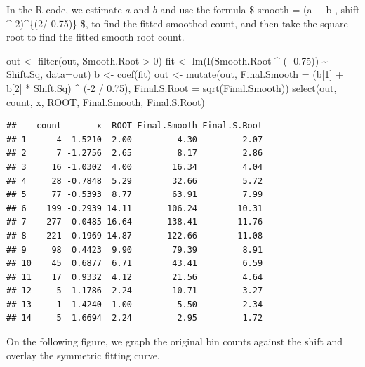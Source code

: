 \documentclass[
]{book}
\newenvironment{Shaded}{\begin{snugshade}}{\end{snugshade}}
\newcommand{\AttributeTok}[1]{\textcolor[rgb]{0.77,0.63,0.00}{#1}}
\newcommand{\DecValTok}[1]{\textcolor[rgb]{0.00,0.00,0.81}{#1}}
\newcommand{\FloatTok}[1]{\textcolor[rgb]{0.00,0.00,0.81}{#1}}
\newcommand{\FunctionTok}[1]{\textcolor[rgb]{0.00,0.00,0.00}{#1}}
\newcommand{\NormalTok}[1]{#1}
\newcommand{\OtherTok}[1]{\textcolor[rgb]{0.56,0.35,0.01}{#1}}
\newcommand{\SpecialCharTok}[1]{\textcolor[rgb]{0.00,0.00,0.00}{#1}}
\begin{document}
In the R code, we estimate \(a\) and \(b\) and use the formula \$
smooth = (a + b , shift \^{} 2)\^{}\{(2/-0.75)\}
\$, to find the fitted smoothed count, and then take the square root to find the fitted smooth root count.

\begin{Shaded}
\begin{Highlighting}[]
\NormalTok{out }\OtherTok{\textless{}{-}} \FunctionTok{filter}\NormalTok{(out, Smooth.Root }\SpecialCharTok{\textgreater{}} \DecValTok{0}\NormalTok{)}
\NormalTok{fit }\OtherTok{\textless{}{-}} \FunctionTok{lm}\NormalTok{(}\FunctionTok{I}\NormalTok{(Smooth.Root }\SpecialCharTok{\^{}}\NormalTok{ (}\SpecialCharTok{{-}} \FloatTok{0.75}\NormalTok{)) }\SpecialCharTok{\textasciitilde{}}\NormalTok{ Shift.Sq, }
          \AttributeTok{data=}\NormalTok{out)}
\NormalTok{b }\OtherTok{\textless{}{-}} \FunctionTok{coef}\NormalTok{(fit)}
\NormalTok{out }\OtherTok{\textless{}{-}} \FunctionTok{mutate}\NormalTok{(out, }\AttributeTok{Final.Smooth =} 
\NormalTok{      (b[}\DecValTok{1}\NormalTok{] }\SpecialCharTok{+}\NormalTok{ b[}\DecValTok{2}\NormalTok{] }\SpecialCharTok{*}\NormalTok{ Shift.Sq) }\SpecialCharTok{\^{}}\NormalTok{ (}\SpecialCharTok{{-}}\DecValTok{2} \SpecialCharTok{/} \FloatTok{0.75}\NormalTok{),}
      \AttributeTok{Final.S.Root =} \FunctionTok{sqrt}\NormalTok{(Final.Smooth))}
\FunctionTok{select}\NormalTok{(out, count, x, ROOT, Final.Smooth, Final.S.Root)}
\end{Highlighting}
\end{Shaded}

\begin{verbatim}
##    count       x  ROOT Final.Smooth Final.S.Root
## 1      4 -1.5210  2.00         4.30         2.07
## 2      7 -1.2756  2.65         8.17         2.86
## 3     16 -1.0302  4.00        16.34         4.04
## 4     28 -0.7848  5.29        32.66         5.72
## 5     77 -0.5393  8.77        63.91         7.99
## 6    199 -0.2939 14.11       106.24        10.31
## 7    277 -0.0485 16.64       138.41        11.76
## 8    221  0.1969 14.87       122.66        11.08
## 9     98  0.4423  9.90        79.39         8.91
## 10    45  0.6877  6.71        43.41         6.59
## 11    17  0.9332  4.12        21.56         4.64
## 12     5  1.1786  2.24        10.71         3.27
## 13     1  1.4240  1.00         5.50         2.34
## 14     5  1.6694  2.24         2.95         1.72
\end{verbatim}

On the following figure, we graph the original bin counts against the shift and overlay the symmetric fitting curve.
\end{document}
